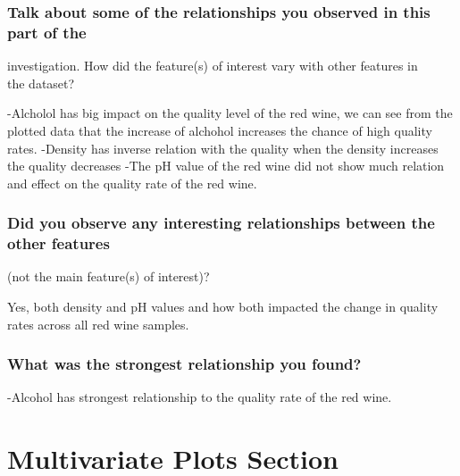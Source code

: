 \documentclass[]{article}
\begin{document}
\hypertarget{talk-about-some-of-the-relationships-you-observed-in-this-part-of-the}{%
\subsubsection{\texorpdfstring{Talk about some of the relationships you
observed in this part of the\\
}{Talk about some of the relationships you observed in this part of the }}\label{talk-about-some-of-the-relationships-you-observed-in-this-part-of-the}}

investigation. How did the feature(s) of interest vary with other
features in\\
the dataset?

-Alcholol has big impact on the quality level of the red wine, we can
see from the plotted data that the increase of alchohol increases the
chance of high quality rates. -Density has inverse relation with the
quality when the density increases the quality decreases -The pH value
of the red wine did not show much relation and effect on the quality
rate of the red wine.

\hypertarget{did-you-observe-any-interesting-relationships-between-the-other-features}{%
\subsubsection{\texorpdfstring{Did you observe any interesting
relationships between the other features\\
}{Did you observe any interesting relationships between the other features }}\label{did-you-observe-any-interesting-relationships-between-the-other-features}}

(not the main feature(s) of interest)?

Yes, both density and pH values and how both impacted the change in
quality rates across all red wine samples.

\hypertarget{what-was-the-strongest-relationship-you-found}{%
\subsubsection{What was the strongest relationship you
found?}\label{what-was-the-strongest-relationship-you-found}}

-Alcohol has strongest relationship to the quality rate of the red wine.

\hypertarget{multivariate-plots-section}{%
\section{Multivariate Plots Section}\label{multivariate-plots-section}}
\end{document}
